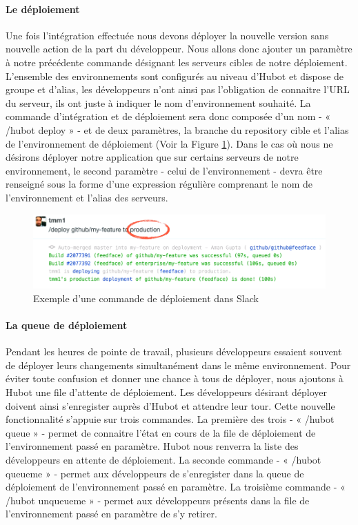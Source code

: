           \paragraph{Le déploiement} Une fois l'intégration effectuée nous devons déployer la nouvelle version sans nouvelle action de la part du développeur. Nous allons donc ajouter un paramètre à notre précédente commande désignant les serveurs cibles de notre déploiement. L'ensemble des environnements sont configurés au niveau d'Hubot et dispose de groupe et d'alias, les développeurs n'ont ainsi pas l'obligation de connaitre l'URL du serveur, ils ont juste à indiquer le nom d'environnement souhaité.
          La commande d'intégration et de déploiement sera donc composée d'un nom - « /hubot deploy » - et de deux paramètres, la branche du repository cible et l'alias de l'environnement de déploiement (Voir la Figure \ref{SlackDeploy}).
          Dans le cas où nous ne désirons déployer notre application que sur certains serveurs de notre environnement, le second paramètre - celui de l'environnement - devra être renseigné sous la forme d'une expression régulière comprenant le nom de l'environnement et l'alias des serveurs.

          \begin{figure}
            \begin{center}
              \includegraphics[scale=0.5]{images/SlackDeploy.png}
            \end{center}
            \caption{Exemple d'une commande de déploiement dans Slack}
            \label{SlackDeploy}
          \end{figure}

          \paragraph{La queue de déploiement} Pendant les heures de pointe de travail, plusieurs développeurs essaient souvent de déployer leurs changements simultanément dans le même environnement. Pour éviter toute confusion et donner une chance à tous de déployer, nous ajoutons à Hubot une file d'attente de déploiement. Les développeurs désirant déployer doivent ainsi s'enregister auprès d'Hubot et attendre leur tour. Cette nouvelle fonctionnalité s'appuie sur trois commandes.
          La première des trois - « /hubot queue » - permet de connaitre l'état en cours de la file de déploiement de l'environnement passé en paramètre. Hubot nous renverra la liste des développeurs en attente de déploiement.
          La seconde commande - « /hubot queueme » - permet aux développeurs de s'enregister dans la queue de déploiement de l'environnement passé en paramètre.
          La troisième commande - « /hubot unqueueme » - permet aux développeurs présents dans la file de l'environnement passé en paramètre de s'y retirer.


